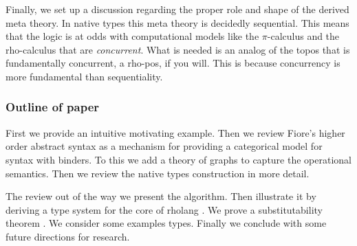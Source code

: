 Finally, we set up a discussion regarding the proper role and shape of
the derived meta theory. In native types this meta theory is decidedly
sequential. This means that the logic is at odds with computational
models like the $\pi$-calculus \cite{milner91polyadicpi} and the
rho-calculus \cite{DBLP:journals/entcs/MeredithR05} that are
\emph{concurrent}. What is needed is an analog of the topos that is
fundamentally concurrent, a rho-pos, if you will. This is because
concurrency is more fundamental than sequentiality.

\subsubsection{Outline of paper}
First we provide an intuitive motivating example. Then we review
Fiore's higher order abstract syntax \cite{DBLP:conf/csl/FioreH10}
\cite{DBLP:conf/mfcs/FioreM10} as a mechanism for providing a
categorical model for syntax with binders. To this we add a theory of
graphs to capture the operational semantics. Then we review the native
types construction \cite{DBLP:journals/corr/abs-2102-04672} in more
detail.

The review out of the way we present the algorithm. Then illustrate it
by deriving a type system for the core of rholang
\cite{meredith__rholang_2017}. We prove a substitutability theorem
\cite{DBLP:conf/oopsla/Liskov87}. We consider some examples
types. Finally we conclude with some future directions for research.

